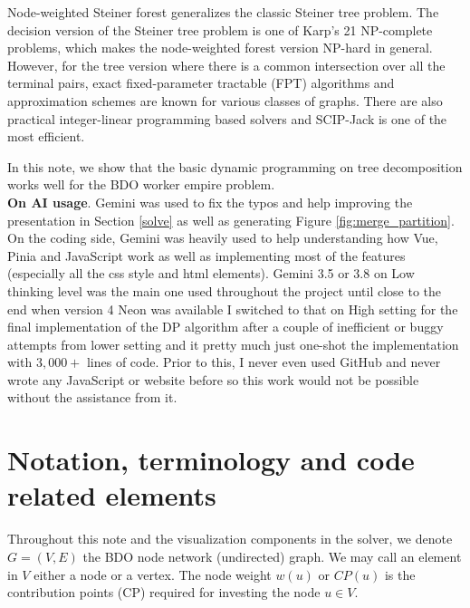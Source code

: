 \documentclass[11pt]{article}
\theoremstyle{definition}
\theoremstyle{remark}
\begin{document}
Node-weighted Steiner forest generalizes the classic Steiner tree problem. The decision version of the Steiner tree problem is one of Karp's 21 NP-complete problems, which makes the node-weighted forest version NP-hard in general. However, for the tree version where there is a common intersection over all the terminal pairs, exact fixed-parameter tractable (FPT) algorithms and approximation schemes are known for various classes of graphs. There are also practical integer-linear programming based solvers and SCIP-Jack is one of the most efficient.

In this note, we show that the basic dynamic programming on tree decomposition works well for the BDO worker empire problem.\\

\noindent
\textbf{On AI usage}. Gemini was used to fix the typos and help improving the presentation in Section \ref{solve} as well as generating Figure \ref{fig:merge_partition}. On the coding side, Gemini was heavily used to help understanding how Vue, Pinia and JavaScript work as well as implementing most of the features (especially all the css style and html elements). Gemini 3.5 or 3.8 on Low thinking level was the main one used throughout the project until close to the end when version 4 Neon was available I switched to that on High setting for the final implementation of the DP algorithm after a couple of inefficient or buggy attempts from lower setting and it pretty much just one-shot the implementation with $3,000+$ lines of code. Prior to this, I never even used GitHub and never wrote any JavaScript or website before so this work would not be possible without the assistance from it.



\section{Notation, terminology and code related elements}
Throughout this note and the visualization components in the solver, we denote $G = (V, E)$ the BDO node network (undirected) graph. We may call an element in $V$ either a node or a vertex. The node weight $w(u)$ or $CP(u)$ is the contribution points (CP) required for investing the node $u \in V$.
\end{document}
